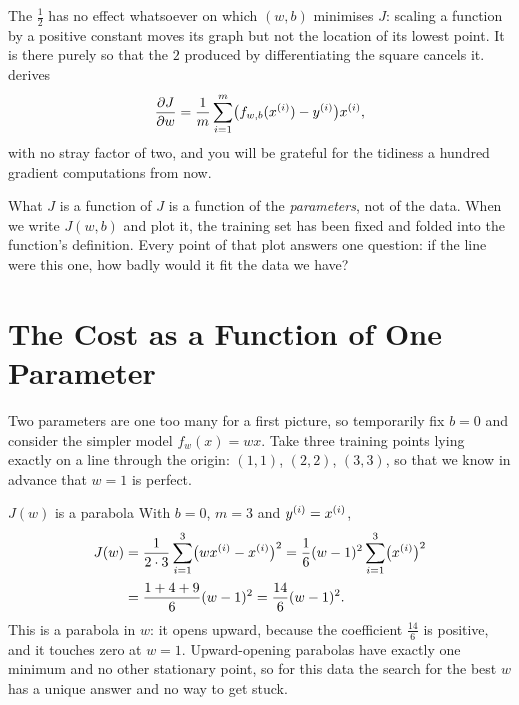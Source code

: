The $\tfrac12$ has no effect whatsoever on which $(w,b)$ minimises $J$: scaling
a function by a positive constant moves its graph but not the location of its
lowest point. It is there purely so that the $2$ produced by differentiating the
square cancels it.  derives
\[
  \frac{\partial J}{\partial w}
    = \frac{1}{m}\sum_{i=1}^{m}\bigl(f_{w,b}(x^{(i)})-y^{(i)}\bigr)x^{(i)},
\]
with no stray factor of two, and you will be grateful for the tidiness a hundred
gradient computations from now.

\begin{keyinsight}{What $J$ is a function of}
$J$ is a function of the \emph{parameters}, not of the data. When we write
$J(w,b)$ and plot it, the training set has been fixed and folded into the
function's definition. Every point of that plot answers one question: if the
line were this one, how badly would it fit the data we have?
\end{keyinsight}

\section{The Cost as a Function of One Parameter}
\label{sec:cost-one-param}

Two parameters are one too many for a first picture, so temporarily fix $b = 0$
and consider the simpler model $f_w(x) = wx$. Take three training points lying
exactly on a line through the origin: $(1,1)$, $(2,2)$, $(3,3)$, so that we know
in advance that $w = 1$ is perfect.

\begin{derivation}{$J(w)$ is a parabola}
With $b=0$, $m=3$ and $y^{(i)} = x^{(i)}$,
\[
  \begin{aligned}
    J(w) &= \frac{1}{2\cdot 3}\sum_{i=1}^{3}\bigl(wx^{(i)}-x^{(i)}\bigr)^{2}
          = \frac{1}{6}(w-1)^{2}\sum_{i=1}^{3}\bigl(x^{(i)}\bigr)^{2}\\[2pt]
         &= \frac{1+4+9}{6}(w-1)^{2}
          = \frac{14}{6}(w-1)^{2}.
  \end{aligned}
\]
This is a parabola in $w$: it opens upward, because the coefficient
$\tfrac{14}{6}$ is positive, and it touches zero at $w=1$. Upward-opening
parabolas have exactly one minimum and no other stationary point, so for this
data the search for the best $w$ has a unique answer and no way to get stuck.
\end{derivation}

